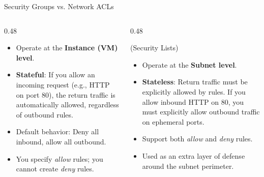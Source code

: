 \documentclass[aspectratio=169]{beamer}  %
\begin{document}
\begin{frame}[t]{Security Groups vs. Network ACLs}
    \begin{columns}[T]
        \begin{column}{0.48\textwidth}
            \begin{block}{}
                \footnotesize
                \begin{itemize}
                    \item Operate at the \textbf{Instance (VM) level}.
                    \item \textbf{Stateful}: If you allow an incoming request (e.g., HTTP on port 80), the return traffic is automatically allowed, regardless of outbound rules.
                    \item Default behavior: Deny all inbound, allow all outbound.
                    \item You specify \textit{allow} rules; you cannot create \textit{deny} rules.
                \end{itemize}
            \end{block}
        \end{column}
        \begin{column}{0.48\textwidth}
            \begin{block}{ (Security Lists)}
                \footnotesize
                \begin{itemize}
                    \item Operate at the \textbf{Subnet level}.
                    \item \textbf{Stateless}: Return traffic must be explicitly allowed by rules. If you allow inbound HTTP on 80, you must explicitly allow outbound traffic on ephemeral ports.
                    \item Support both \textit{allow} and \textit{deny} rules.
                    \item Used as an extra layer of defense around the subnet perimeter.
                \end{itemize}
            \end{block}
        \end{column}
    \end{columns}
\end{frame}

\end{document}
